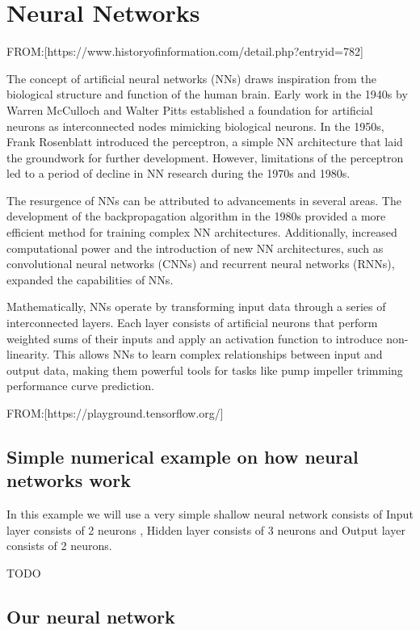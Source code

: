 \documentclass[
  super,
  review,
  3p]{elsarticle}
\begin{document}
\section{Neural Networks}\label{neural-networks}

FROM:{[}https://www.historyofinformation.com/detail.php?entryid=782{]}

The concept of artificial neural networks (NNs) draws inspiration from
the biological structure and function of the human brain. Early work in
the 1940s by Warren McCulloch and Walter Pitts established a foundation
for artificial neurons as interconnected nodes mimicking biological
neurons. In the 1950s, Frank Rosenblatt introduced the perceptron, a
simple NN architecture that laid the groundwork for further development.
However, limitations of the perceptron led to a period of decline in NN
research during the 1970s and 1980s.

The resurgence of NNs can be attributed to advancements in several
areas. The development of the backpropagation algorithm in the 1980s
provided a more efficient method for training complex NN architectures.
Additionally, increased computational power and the introduction of new
NN architectures, such as convolutional neural networks (CNNs) and
recurrent neural networks (RNNs), expanded the capabilities of NNs.

Mathematically, NNs operate by transforming input data through a series
of interconnected layers. Each layer consists of artificial neurons that
perform weighted sums of their inputs and apply an activation function
to introduce non-linearity. This allows NNs to learn complex
relationships between input and output data, making them powerful tools
for tasks like pump impeller trimming performance curve prediction.

FROM:{[}https://playground.tensorflow.org/{]}

\subsection{Simple numerical example on how neural networks
work}\label{simple-numerical-example-on-how-neural-networks-work}

In this example we will use a very simple shallow neural network
consists of Input layer consists of 2 neurons , Hidden layer consists of
3 neurons and Output layer consists of 2 neurons.

TODO

\subsection{Our neural network}\label{our-neural-network}
\end{document}
